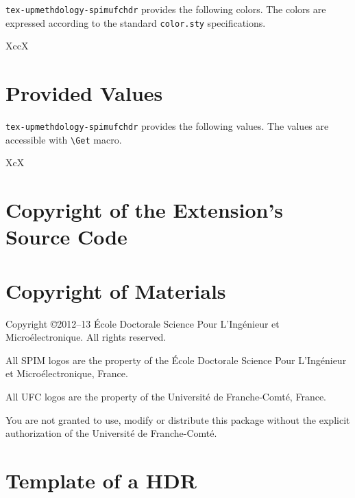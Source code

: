 \documentclass[article,english]{upmethodology-document}
\gdef\upmextensiondoccolorlist{}
\gdef\upmextensiondocvaluelist{}
\begin{document}
\texttt{tex-upmethdology-spimufchdr} provides the following colors. The colors are expressed according to the standard \texttt{color.sty} specifications.

\begin{mtabular}{4}{XccX}
\upmextensiondoccolorlist
\end{mtabular}

\section{Provided Values}

\texttt{tex-upmethdology-spimufchdr} provides the following values. The values are accessible with \texttt{{\textbackslash}Get} macro.

\begin{mtabular}{3}{XcX}
\end{mtabular}

\section{Copyright of the Extension's Source Code}



\section{Copyright of Materials}

Copyright \copyright 2012--13 \'Ecole Doctorale Science Pour L'Ing\'enieur et Micro\'electronique. All rights reserved.

All SPIM logos are the property of the \'Ecole Doctorale Science Pour L'Ing\'enieur et Micro\'electronique, France.

All UFC logos are the property of the Universit\'e de Franche-Comt\'e, France.

You are not granted to use, modify or distribute this package without the explicit authorization of the Universit\'e de Franche-Comt\'e.

\section{Template of a HDR}


\end{document}
